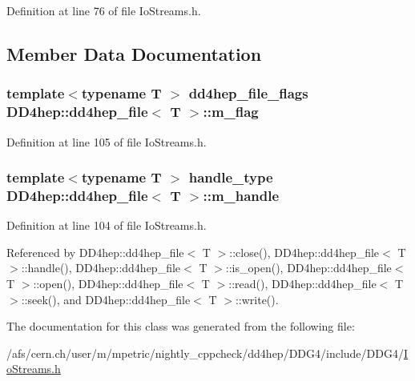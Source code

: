 Definition at line 76 of file IoStreams.h.

\subsection{Member Data Documentation}
\hypertarget{class_d_d4hep_1_1dd4hep__file_ae278513f83e549eda9cf0e01998a6726}{
\subsubsection[{m\_\-flag}]{\setlength{\rightskip}{0pt plus 5cm}template$<$typename T $>$ {\bf dd4hep\_\-file\_\-flags} {\bf DD4hep::dd4hep\_\-file}$<$ {\bf T} $>$::{\bf m\_\-flag}}}
\label{class_d_d4hep_1_1dd4hep__file_ae278513f83e549eda9cf0e01998a6726}


Definition at line 105 of file IoStreams.h.\hypertarget{class_d_d4hep_1_1dd4hep__file_a198f202b4b952426543a8df41a21a232}{
\subsubsection[{m\_\-handle}]{\setlength{\rightskip}{0pt plus 5cm}template$<$typename T $>$ {\bf handle\_\-type} {\bf DD4hep::dd4hep\_\-file}$<$ {\bf T} $>$::{\bf m\_\-handle}}}
\label{class_d_d4hep_1_1dd4hep__file_a198f202b4b952426543a8df41a21a232}


Definition at line 104 of file IoStreams.h.

Referenced by DD4hep::dd4hep\_\-file$<$ T $>$::close(), DD4hep::dd4hep\_\-file$<$ T $>$::handle(), DD4hep::dd4hep\_\-file$<$ T $>$::is\_\-open(), DD4hep::dd4hep\_\-file$<$ T $>$::open(), DD4hep::dd4hep\_\-file$<$ T $>$::read(), DD4hep::dd4hep\_\-file$<$ T $>$::seek(), and DD4hep::dd4hep\_\-file$<$ T $>$::write().

The documentation for this class was generated from the following file:\begin{DoxyCompactItemize}
\item 
/afs/cern.ch/user/m/mpetric/nightly\_\-cppcheck/dd4hep/DDG4/include/DDG4/\hyperlink{_io_streams_8h}{IoStreams.h}\end{DoxyCompactItemize}
